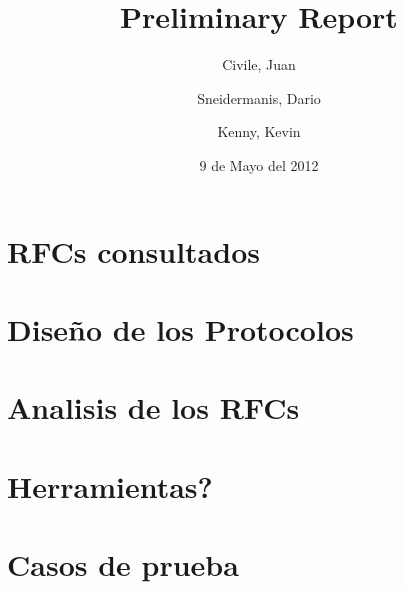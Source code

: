 \documentclass[11pt,a4paper,titlepage]{article}
\title{Preliminary Report}
\author{Civile, Juan \and Sneidermanis, Dario \and Kenny, Kevin}
\date{9 de Mayo del 2012}
\begin{document}
\newcommand{\awesome}[1]{\texttt{\textbf{#1}}}
\maketitle
\tableofcontents
\clearpage

\section{RFCs consultados}

\section{Diseño de los Protocolos}

\section{Analisis de los RFCs}

\section{Herramientas?}

\section{Casos de prueba}
\end{document}
